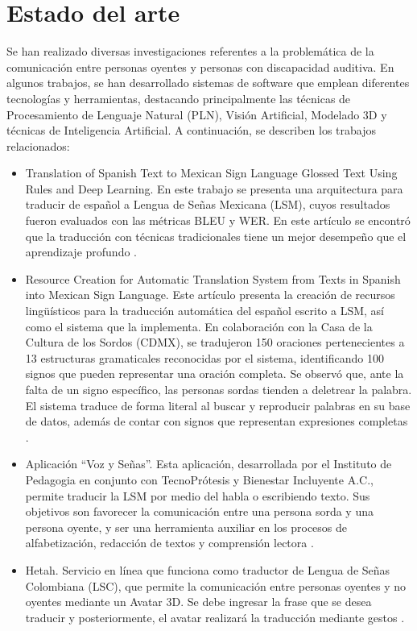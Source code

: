 \section{Estado del arte}
Se han realizado diversas investigaciones referentes a la problemática de la comunicación entre personas oyentes y personas con discapacidad auditiva. En algunos trabajos, se han desarrollado sistemas de software que emplean diferentes tecnologías y herramientas, destacando principalmente las técnicas de Procesamiento de Lenguaje Natural (PLN), Visión Artificial, Modelado 3D y técnicas de Inteligencia Artificial. A continuación, se describen los trabajos relacionados: \begin{itemize}
    \item Translation of Spanish Text to Mexican Sign Language Glossed Text Using Rules and Deep Learning. En este trabajo se presenta una arquitectura para traducir de español a Lengua de Señas Mexicana (LSM), cuyos resultados fueron evaluados con las métricas BLEU y WER. En este artículo se encontró que la traducción con técnicas tradicionales tiene un mejor desempeño que el aprendizaje profundo \cite{ref8}.
    \item Resource Creation for Automatic Translation System from Texts in Spanish into Mexican Sign Language. Este artículo presenta la creación de recursos lingüísticos para la traducción automática del español escrito a LSM, así como el sistema que la implementa. En colaboración con la Casa de la Cultura de los Sordos (CDMX), se tradujeron 150 oraciones pertenecientes a 13 estructuras gramaticales reconocidas por el sistema, identificando 100 signos que pueden representar una oración completa. Se observó que, ante la falta de un signo específico, las personas sordas tienden a deletrear la palabra. El sistema traduce de forma literal al buscar y reproducir palabras en su base de datos, además de contar con signos que representan expresiones completas \cite{ref9}.
    \item Aplicación “Voz y Señas”. Esta aplicación, desarrollada por el Instituto de Pedagogia en conjunto con TecnoPrótesis y Bienestar Incluyente A.C., permite traducir la LSM por medio del habla o escribiendo texto. Sus objetivos son favorecer la comunicación entre una persona sorda y una persona oyente, y ser una herramienta auxiliar en los procesos de alfabetización, redacción de textos y comprensión lectora \cite{ref10}. 
    \item Hetah. Servicio en línea que funciona como traductor de Lengua de Señas Colombiana (LSC), que permite la comunicación entre personas oyentes y no oyentes mediante un Avatar 3D. Se debe ingresar la frase que se desea traducir y posteriormente, el avatar realizará la traducción mediante gestos \cite{ref11}. 

\end{itemize}
